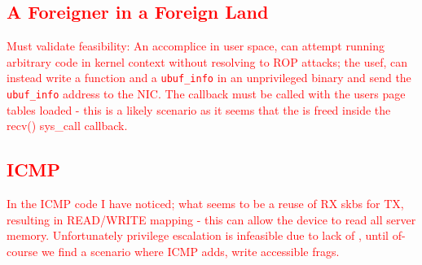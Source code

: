 \textcolor{red}{
\subsection{A Foreigner in a Foreign Land}
Must validate feasibility: An accomplice in user space, can attempt running arbitrary code in kernel context without resolving to ROP attacks; the usef, can instead write a function and a \texttt{ubuf\_info} in an unprivileged binary and send the \texttt{ubuf\_info} address to the NIC. The \shinfo callback must be called with the users page tables loaded - this is a likely scenario as it seems that the \skb is freed inside the recv() sys\_call callback.}


\textcolor{red}{\subsection{ICMP}
In the ICMP code I have noticed; what seems to be a reuse of RX skbs for TX, resulting in READ/WRITE mapping - this can allow the device to read all server memory. Unfortunately privilege escalation is infeasible due to lack of \means, until of-course we find a scenario where ICMP adds, write accessible frags.} 

\begin{comment}
\section{RDMA}
Remote DMA(RDMA)\footnote{Member Companies of Openfabrics alliance are mostly behind these technologies \url{https://www.openfabrics.org/}} is a set of protocols(Infiniband,IWARP,RoCE) that facilitate access to the main memory of a remote machines. We wanted to see if some of the attacks could be perpetrated via a malicious peer.  
We didn't find any risks associated with RDMA, other than the risks associated with device drivers, listed in this paper. The ipoib driver is one such driver, one which also maps \shinfo. A malicious device is still needed, as the post\_send/post\_receive API used by the ipoib driver is similar in function to the usual way NICs function; namely a remote user can't pick where to write or choose to write more than once to the same address. These kinds of operations are supported by rdma\_read/write API; which provides the peer with the ability to read/write from/to a specified addresses. We didn't find any uses for this kind of API in the Linux kernel. With post\_send/post\_receive API, the remote host can only modify legitimate memory buffers; and thus can't take advantage of sub-page vulnerabilities.
\textcolor{red}{Am I answering a question that no one asked?}
\end{comment}

